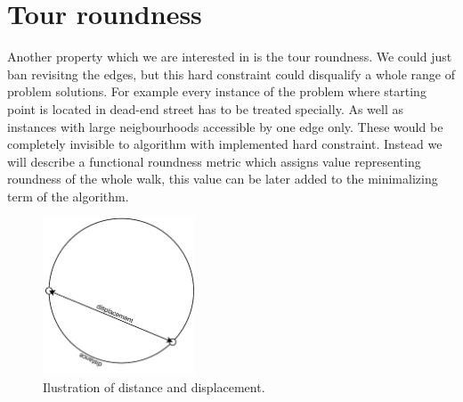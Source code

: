 \documentclass{ctuthesis}
\begin{document}
\section{Tour roundness}
Another property which we are interested in is the tour roundness. We could just ban revisitng the edges, but this hard constraint could disqualify a whole range of problem solutions. For example every instance of the problem where starting point is located in dead-end street has to be treated specially. As well as instances with large neigbourhoods accessible by one edge only. These would be completely invisible to algorithm with implemented hard constraint. Instead we will describe a functional roundness metric which assigns value representing roundness of the whole walk, this value can be later added to the minimalizing term of the algorithm.\par

\begin{figure}
	\includegraphics[width=0.4\textwidth]{displacement}
	\caption{Ilustration of distance and displacement.}
\end{figure}
\end{document}
